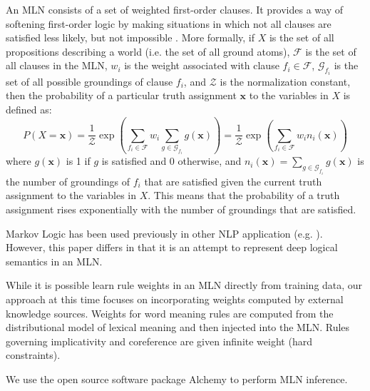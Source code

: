 An MLN consists of a set of weighted first-order clauses.  It provides a way of
softening first-order logic by making situations in which not all clauses are
satisfied less likely, but not impossible \citep{richardson:mlj06}. More
formally, if $X$ is the set of all propositions describing a world (i.e. the
set of all ground atoms), $\mathcal{F}$ is the set of all clauses in the MLN,
$w_i$ is the weight associated with clause $f_i \in \mathcal{F}$,
$\mathcal{G}_{f_i}$ is the set of all possible groundings of clause $f_i$, and
$\mathcal{Z}$ is the normalization constant, then the probability of a
particular truth assignment $\mathbf{x}$ to the variables in $X$ is defined as:
\[ P(X = \mathbf{x}) = \frac{1}{\mathcal{Z}} \exp\left(\sum_{f_i \in
\mathcal{F}} w_i \sum_{g \in \mathcal{G}_{f_i}}g(\mathbf{x}) \right) =
\frac{1}{\mathcal{Z}} \exp\left(\sum_{f_i \in \mathcal{F}} w_i n_i(\mathbf{x})
\right) \tag{1}\label{e1} \] where $g(\mathbf{x})$ is 1 if $g$ is satisfied and
0 otherwise, and $n_i(\mathbf{x})= \sum_{g\in \mathcal{G}_{f_i}}g(\mathbf{x})$
is the number of groundings of $f_i$ that are satisfied given the current truth
assignment to the variables in $X$. This means that the probability of a truth
assignment rises exponentially with the number of groundings that are satisfied.

Markov Logic has been used previously in other NLP application
(e.g. \citet{poon:emnlp2009}).  However, this paper differs in that it is an
attempt to represent deep logical semantics in an MLN.

While it is possible learn rule weights in an MLN directly from training data,
our approach at this time focuses on incorporating weights computed
by external knowledge sources.  Weights for word meaning rules are computed from
the distributional model of lexical meaning and then injected into the MLN. 
Rules governing implicativity and coreference are given infinite weight
(hard constraints).

We use the open source software package Alchemy \citep{kok:tr05} to perform MLN
inference.
